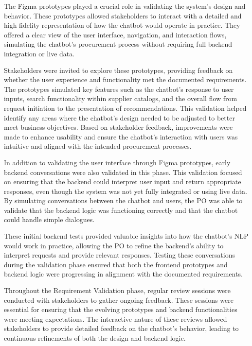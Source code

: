 The Figma prototypes played a crucial role in validating the system’s design and behavior. These prototypes allowed
stakeholders to interact with a detailed and high-fidelity representation of how the chatbot would operate in practice.
They offered a clear view of the user interface, navigation, and interaction flows, simulating the chatbot’s procurement
process without requiring full backend integration or live data.

Stakeholders were invited to explore these prototypes, providing feedback on whether the user experience and
functionality met the documented requirements. The prototypes simulated key features such as the chatbot’s response to
user inputs, search functionality within supplier catalogs, and the overall flow from request initiation to the
presentation of recommendations. This validation helped identify any areas where the chatbot’s design needed to be
adjusted to better meet business objectives. Based on stakeholder feedback, improvements were made to enhance usability
and ensure the chatbot’s interaction with users was intuitive and aligned with the intended procurement processes.

In addition to validating the user interface through Figma prototypes, early backend conversations were also validated
in this phase. This validation focused on ensuring that the backend could interpret user input and return appropriate
responses, even though the system was not yet fully integrated or using live data. By simulating conversations between
the chatbot and users, the \acs{PO} was able to validate that the backend logic was functioning correctly and that the
chatbot could handle simple dialogues.

These initial backend tests provided valuable insights into how the chatbot’s \acs{NLP} would work in practice, allowing
the \acs{PO} to refine the backend’s ability to interpret requests and provide relevant responses. Testing these
conversations during the validation phase ensured that both the frontend prototypes and backend logic were progressing
in alignment with the documented requirements.

Throughout the Requirement Validation phase, regular review sessions were conducted with stakeholders to gather ongoing
feedback. These sessions were essential for ensuring that the evolving prototypes and backend functionalities were
meeting expectations. The interactive nature of these reviews allowed stakeholders to provide detailed feedback on the
chatbot’s behavior, leading to continuous refinements of both the design and backend logic.

